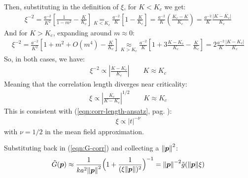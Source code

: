 \documentclass[../../main.tex]{subfiles}
\begin{document}
Then, substituting in the definition of $\xi$, for $K < K_c$ we get:
\begin{align*}
    \xi^{-2} = \frac{a^{-2}}{K^2} \left[\frac{1}{1-m^2} - \frac{K}{K_c}  \right] \underset{K < K_c}{=}  \frac{a^{-2}}{K} \left[1-\frac{K}{K_c} \right] = \frac{a^{-2}}{K}\left(\frac{K_c - K}{K_c} \right) = \frac{a^{-2}}{K} \frac{|K-K_c|}{K_c}  
\end{align*}
And for $K > K_c$, expanding around $m \approx 0$:
\begin{align*}
    \xi^{-2} = \frac{a^{-2}}{K^2} \left[1 + m^2 + O(m^4)- \frac{K}{K_c} \right] \underset{K > K_c}{\approx} \frac{a^{-2}}{K}\left[1+ 3 \frac{K-K_c}{K_c} - \frac{K}{K_c} \right] = 2 \frac{a^{-2}}{K} \frac{|K-K_c|}{K_c}  
\end{align*}
So, in both cases, we have:
\begin{align*}
    \xi^{-2} \propto \left|\frac{K-K_c}{K_c}\right| \qquad K \approx K_c 
\end{align*}
Meaning that the correlation length diverges near criticality:
\begin{align*}
    \xi \propto \left|\frac{K_c}{K-K_c}\right|^{1/2} \qquad K \approx K_c
\end{align*}
This is consistent with (\ref{eqn:corr-length-ansatz}, pag. \pageref{eqn:corr-length-ansatz}):
\begin{align*}
    \xi \propto |t|^{-\nu}
\end{align*}
with $\nu = 1/2$ in the mean field approximation.

\medskip

Substituting back in (\ref{eqn:G-corr}) and collecting a $\norm{\bm{p}}^2$:
\begin{align} \label{eqn:corr-transform}
    \tilde{G}(\bm{p}) \approx \frac{1}{ka^2 \norm{\bm{p}}^2} \Big(1 + \frac{1}{(\xi \norm{\bm{p}})^2} \Big)^{-1} = \norm{\bm{p}}^{-2} \tilde{g}(\norm{\bm{p}} \xi)
\end{align}
\end{document}
